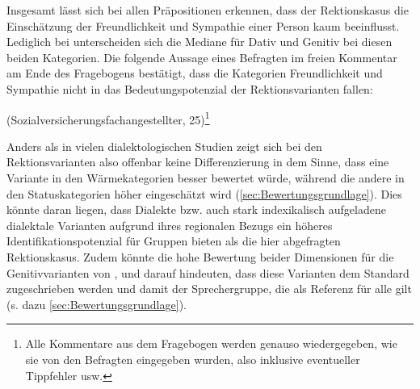 Insgesamt lässt sich bei allen Präpositionen erkennen, dass der Rektionskasus die Einschätzung der Freundlichkeit und Sympathie einer Person kaum beeinflusst.
Lediglich bei \dank{} unterscheiden sich die Mediane für Dativ und Genitiv bei diesen beiden Kategorien.  
Die folgende Aussage eines Befragten im freien Kommentar am Ende des Fragebogens bestätigt, dass die Kategorien Freundlichkeit und Sympathie nicht in das Bedeutungspotenzial der Rektionsvarianten fallen: 
\begin{exe}
\ex {} (Sozialversicherungsfachangestellter, 25)\footnote{Alle Kommentare aus dem Fragebogen werden genauso wiedergegeben, wie sie von den Befragten eingegeben wurden, also inklusive eventueller Tippfehler usw.}
\end{exe}
Anders als in vielen dialektologischen Studien zeigt sich bei den Rektionsvarianten also offenbar keine Differenzierung in dem Sinne, dass eine Variante in den Wärmekategorien besser bewertet würde, während die andere in den Statuskategorien höher eingeschätzt wird (\autoref{sec:Bewertungsgrundlage}).
Dies könnte daran liegen, dass Dialekte bzw. auch stark indexikalisch aufgeladene dialektale Varianten aufgrund ihres regionalen Bezugs ein höheres Identifikationspotenzial für Gruppen bieten als die hier abgefragten Rektionskasus.
Zudem könnte die hohe Bewertung beider Dimensionen für die Genitivvarianten von \wegen, \waehrend{} und \dank{} darauf hindeuten, dass diese Varianten dem Standard zugeschrieben werden und damit der Sprechergruppe, die als Referenz für alle gilt (s. dazu \autoref{sec:Bewertungsgrundlage}). %

